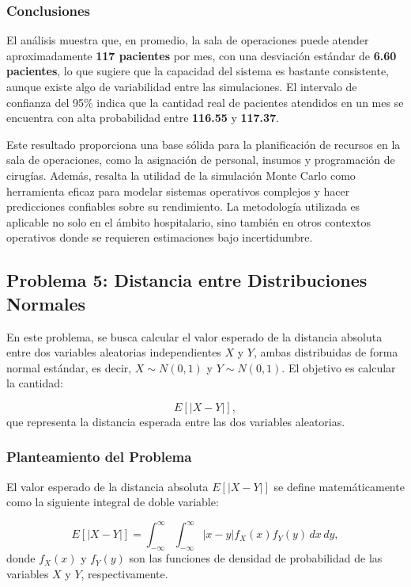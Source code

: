 \documentclass[12pt]{article}
\begin{document}
\subsubsection*{Conclusiones}
El análisis muestra que, en promedio, la sala de operaciones puede atender aproximadamente \textbf{117 pacientes} por mes, con una desviación estándar de \textbf{6.60 pacientes}, lo que sugiere que la capacidad del sistema es bastante consistente, aunque existe algo de variabilidad entre las simulaciones. El intervalo de confianza del 95\% indica que la cantidad real de pacientes atendidos en un mes se encuentra con alta probabilidad entre \textbf{116.55} y \textbf{117.37}.

Este resultado proporciona una base sólida para la planificación de recursos en la sala de operaciones, como la asignación de personal, insumos y programación de cirugías. Además, resalta la utilidad de la simulación Monte Carlo como herramienta eficaz para modelar sistemas operativos complejos y hacer predicciones confiables sobre su rendimiento. La metodología utilizada es aplicable no solo en el ámbito hospitalario, sino también en otros contextos operativos donde se requieren estimaciones bajo incertidumbre.



\subsection{Problema 5: Distancia entre Distribuciones Normales}

En este problema, se busca calcular el valor esperado de la distancia absoluta entre dos variables aleatorias independientes $X$ y $Y$, ambas distribuidas de forma normal estándar, es decir, $X \sim N(0, 1)$ y $Y \sim N(0, 1)$. El objetivo es calcular la cantidad:

\[
E[|X - Y|],
\]
que representa la distancia esperada entre las dos variables aleatorias.

\subsubsection{Planteamiento del Problema}
El valor esperado de la distancia absoluta $E[|X - Y|]$ se define matemáticamente como la siguiente integral de doble variable:

\[
E[|X - Y|] = \int_{-\infty}^\infty \int_{-\infty}^\infty |x - y| f_X(x) f_Y(y) \, dx \, dy,
\]
donde $f_X(x)$ y $f_Y(y)$ son las funciones de densidad de probabilidad de las variables $X$ y $Y$, respectivamente.
\end{document}

